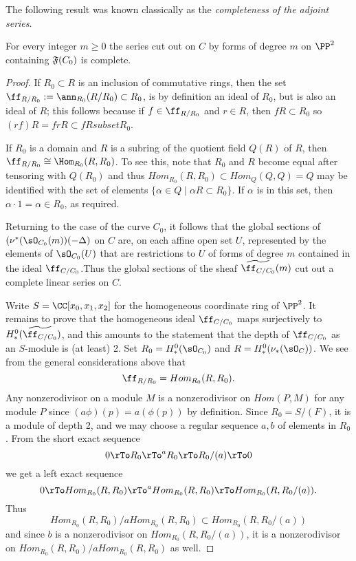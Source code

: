 The following result was known classically as the \emph{completeness of the adjoint series}.

\begin{theorem}\label{conductor completeness}
For every integer $m\geq 0$ the series cut out on $C$ by forms of degree $m$
on $\PP^{2}$ containing $\adj(C_{0})$ is complete.
\end{theorem}

\begin{proof}
If $R_{0}\subset R$ is an inclusion of commutative rings, then the set
$\ff_{R/R_{0}} := \ann_{R_{0}}(R/R_{0})\subset R_{0}$, is by definition an ideal of $R_{0}$, but is also an ideal of $R$; this follows
because if $f\in \ff_{R/R_{0}}$ and $r\in R$, then $fR\subset R_{0}$ so
 $(rf)R = frR \subset fR subset R_{0}$. 

If $R_{0}$ is a domain and $R$ is a subring of the quotient field $Q(R)$ of $R$, then
 $\ff_{R/R_{0}} \cong \Hom_{R_{0}}(R, R_{0})$. To see this, note that $R_{0}$ and $R$ become
 equal after tensoring with $Q(R_{0})$ and thus 
 $Hom_{R_{0}}(R,R_{0}) \subset Hom_{Q}(Q,Q) = Q$ 
 may be identified
 with the set of elements $\{\alpha\in Q\mid \alpha R \subset R_{0}\}$. If $\alpha$ is in this set, then
  $\alpha\cdot 1 = \alpha \in R_{0}$, as required.
  
Returning to the case of the curve $C_{0}$, it follows that the global sections of $(\nu^{*}(\sO_{C_{0}}(m))( -\Delta)$ on $C$
are, on each affine open set $U$, represented by the elements of $\sO_{C_{0}}(U)$ that  are restrictions to $U$
of forms of degree $m$ contained in 
the ideal $\ff_{C/C_{0}}$.Thus
the global sections of the sheaf $\widetilde{\ff_{C/C_{0}}}(m)$ cut out a complete linear series on $C$.

Write $S =\CC[x_{0}, x_{1}, x_{2}]$ for the homogeneous coordinate ring of $\PP^{2}$.
It remains to prove that the homogeneous ideal $\ff_{C/C_{0}}$ maps
surjectively to $H^{0}_{*}(\widetilde{\ff_{C/C_{0}}})$, and this amounts to the
statement that the depth of $\ff_{C/C_{0}}$ as an $S$-module is (at least) 2.
Set $R_{0} = H^{0}_{*}(\sO_{C_{0}})$ and $R = H^{0}_{*}(\nu_{*} (\sO_{C}))$.
We see from the general considerations above that
$$
\ff_{R/R_{0}} = Hom_{R_{0}}(R, R_{0}).
$$ 
Any nonzerodivisor on a module $M$
is a nonzerodivisor on $Hom(P, M)$ for any module $P$ since $(a\phi)(p) = a(\phi(p))$ by definition. 
Since $R_{0} = S/(F)$, it is a module of depth 2, and we may choose a regular sequence
$a,b$ of elements in $R_{0}$. From the short exact sequence
$$
0\rTo R_{0}\rTo^{a} R_{0}\rTo R_{0}/(a) \rTo 0
$$
we get a left exact sequence
$$
0\rTo Hom_{R_{0}}(R,R_{0})\rTo^{a} Hom_{R_{0}}(R,R_{0})\rTo Hom_{R_{0}}(R,R_{0}/(a)).
$$
Thus 
$$
Hom_{R_{0}}(R,R_{0})/aHom_{R_{0}}(R,R_{0}) \subset Hom_{R_{0}}(R,R_{0}/(a))
$$
and since $b$ is a nonzerodivisor on $Hom_{R_{0}}(R,R_{0}/(a))$, it is a nonzerodivisor
on $Hom_{R_{0}}(R,R_{0})/aHom_{R_{0}}(R,R_{0})$ as well.
\end{proof}

